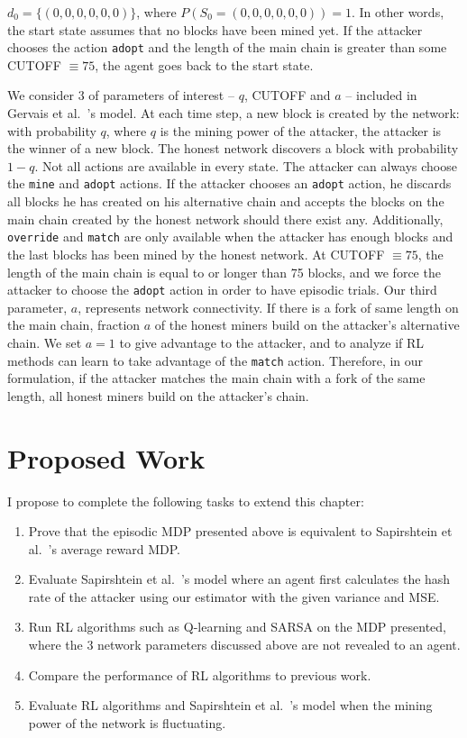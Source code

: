  $d_0 = \{(0, 0, 0, 0, 0, 0)\}$, where $P(S_0 = (0, 0, 0, 0, 0, 0)) = 1$. In other words, the start state assumes that no blocks have been mined yet. If the attacker chooses the action \texttt{adopt} and the length of the main chain is greater than some CUTOFF $\equiv 75$, the agent goes back to the start state.

 We consider 3 of parameters of interest -- $q$, CUTOFF and $a$ -- included in Gervais et al.~\cite{Gervais:2016}'s model. At each time step, a new block is created by the network: with probability $q$, where $q$ is the mining power of the attacker, the attacker is the winner of a new block. The honest network discovers a block with probability $1-q$. Not all actions are available in every state. The attacker can always choose the \texttt{mine} and \texttt{adopt} actions. If the attacker chooses an {\tt adopt} action, he discards all blocks he has created on his alternative chain and accepts the blocks on the main chain created by the honest network should there exist any. Additionally, \texttt{override} and \texttt{match} are only available when the attacker has enough blocks and the last blocks has been mined by the honest network. At CUTOFF $\equiv 75$, the length of the main chain is equal to or longer than 75 blocks, and we force the attacker to choose the \texttt{adopt} action in order to have episodic trials. Our third parameter, $a$, represents network connectivity. If there is a fork of same length on the main chain, fraction $a$ of the honest miners build on the attacker's alternative chain. We set $a=1$ to give advantage to the attacker, and to analyze if RL methods can learn to take advantage of the \texttt{match} action. Therefore, in our formulation, if the attacker matches the main chain with a fork of the same length, all honest miners build on the attacker's chain. 

\section{Proposed Work}\label{section:selfishRL-proposed-work}
I propose to complete the following tasks to extend this chapter:
\begin{enumerate}
\item Prove that the episodic MDP presented above is equivalent to Sapirshtein et al.~\cite{sapirshtein:2015}'s average reward MDP.
\item Evaluate Sapirshtein et al.~\cite{sapirshtein:2015}'s model where an agent first calculates the hash rate of the attacker using our estimator with the given variance and MSE.
\item Run RL algorithms such as Q-learning and SARSA on the MDP presented, where the 3 network parameters discussed above are not revealed to an agent.
\item Compare the performance of RL algorithms to previous work.
\item Evaluate RL algorithms and Sapirshtein et al.~\cite{sapirshtein:2015}'s model when the mining power of the network is fluctuating.
\end{enumerate}

